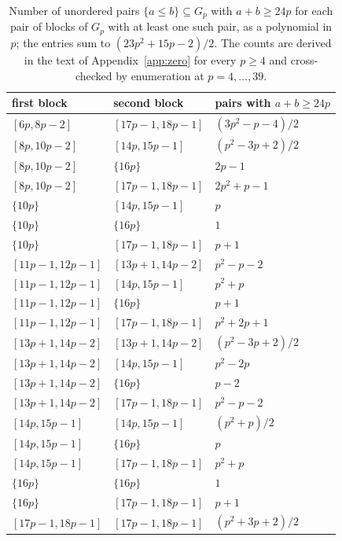 \documentclass[11pt]{article}
\theoremstyle{definition}
\theoremstyle{remark}
\begin{document}
\begin{table}[ht]
\centering
\small
\begin{tabular}{@{}lll@{}}
\toprule
first block & second block & pairs with $a+b\geq24p$\\
\midrule
$[6p,8p-2]$ & $[17p-1,18p-1]$ & $(3p^2-p-4)/2$\\
$[8p,10p-2]$ & $[14p,15p-1]$ & $(p^2-3p+2)/2$\\
$[8p,10p-2]$ & $\{16p\}$ & $2p-1$\\
$[8p,10p-2]$ & $[17p-1,18p-1]$ & $2p^2+p-1$\\
$\{10p\}$ & $[14p,15p-1]$ & $p$\\
$\{10p\}$ & $\{16p\}$ & $1$\\
$\{10p\}$ & $[17p-1,18p-1]$ & $p+1$\\
$[11p-1,12p-1]$ & $[13p+1,14p-2]$ & $p^2-p-2$\\
$[11p-1,12p-1]$ & $[14p,15p-1]$ & $p^2+p$\\
$[11p-1,12p-1]$ & $\{16p\}$ & $p+1$\\
$[11p-1,12p-1]$ & $[17p-1,18p-1]$ & $p^2+2p+1$\\
$[13p+1,14p-2]$ & $[13p+1,14p-2]$ & $(p^2-3p+2)/2$\\
$[13p+1,14p-2]$ & $[14p,15p-1]$ & $p^2-2p$\\
$[13p+1,14p-2]$ & $\{16p\}$ & $p-2$\\
$[13p+1,14p-2]$ & $[17p-1,18p-1]$ & $p^2-p-2$\\
$[14p,15p-1]$ & $[14p,15p-1]$ & $(p^2+p)/2$\\
$[14p,15p-1]$ & $\{16p\}$ & $p$\\
$[14p,15p-1]$ & $[17p-1,18p-1]$ & $p^2+p$\\
$\{16p\}$ & $\{16p\}$ & $1$\\
$\{16p\}$ & $[17p-1,18p-1]$ & $p+1$\\
$[17p-1,18p-1]$ & $[17p-1,18p-1]$ & $(p^2+3p+2)/2$\\
\bottomrule
\end{tabular}
\caption{Number of unordered pairs $\{a\leq b\}\subseteq G_p$ with $a+b\geq24p$ for each pair of blocks of
$G_p$ with at least one such pair, as a polynomial in $p$; the entries sum to $(23p^2+15p-2)/2$. The
counts are derived in the text of Appendix~\ref{app:zero} for every $p\geq4$ and cross-checked by
enumeration at $p=4,\ldots,39$.}
\label{tab:zeropairs}
\end{table}
\end{document}
